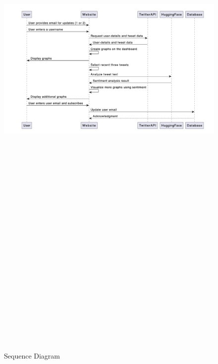 \documentclass[a4paper,12pt]{article}
\begin{document}
{{{		\begin{figure}[htbp]
			\centering
			\includegraphics[width=6in, height=15in, keepaspectratio]{SequenceDiagram.png}
			\label{sequencediagram}
			\caption{Sequence Diagram}
		\end{figure}

}}}
\end{document}

